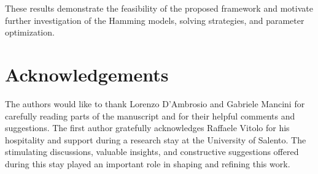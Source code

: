 \documentclass{amsart}
\begin{document}
These results demonstrate the feasibility of the proposed framework and motivate
further investigation of the Hamming models, solving strategies, and parameter optimization.

\section*{Acknowledgements}

The authors would like to thank Lorenzo D'Ambrosio and Gabriele Mancini for carefully
reading parts of the manuscript and for their helpful comments and suggestions. The first
author gratefully acknowledges Raffaele Vitolo for his hospitality and support during
a research stay at the University of Salento. The stimulating discussions, valuable insights,
and constructive suggestions offered during this stay played an important role in shaping
and refining this work.
\end{document}
